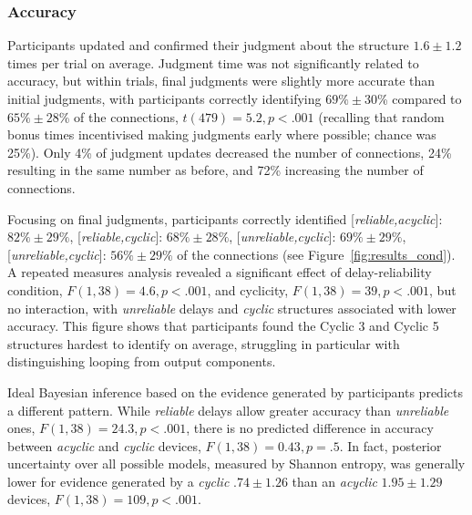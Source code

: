 \documentclass[10pt,letterpaper]{article}
\newcommand{\ttodo}[2][]
{\todo[caption={#2}, size=\small, #1, color = orange, inline]{\renewcommand{\baselinestretch}{1}\selectfont \textbf{TG}: #2}~}
\begin{document}
\subsubsection{Accuracy}

Participants updated and confirmed their judgment about the structure $1.6\pm1.2$ times per trial on average.  Judgment time was not significantly related to accuracy, but within trials, final judgments were slightly more accurate than initial judgments, with participants correctly identifying $69\%\pm30$\% compared to $65\%\pm28$\% of the connections, $t(479) = 5.2, p<.001$ (recalling that random bonus times incentivised making judgments early where possible; chance was 25\%). %
Only 4\% of judgment updates decreased the number of connections, 24\% resulting in the same number as before, and 72\% increasing the number of connections.

Focusing on final judgments, participants correctly identified [\emph{reliable,acyclic}]: $82\%\pm29\%$,  [\emph{reliable,cyclic}]: $68\%\pm28\%$,  [\emph{unreliable,cyclic}]: $69\%\pm29\%$,  [\emph{unreliable,cyclic}]: $56\%\pm29\%$ of the connections (see Figure~\ref{fig:results_cond}).  A repeated measures analysis revealed a significant effect of delay-reliability condition, $F(1, 38)=4.6, p<.001$, and cyclicity, $F(1, 38)= 39, p<.001$, but no interaction, with \emph{unreliable} delays and \emph{cyclic} structures associated with lower accuracy.  This figure shows that participants found the Cyclic 3 and Cyclic 5 structures hardest to identify on average, struggling in particular with distinguishing looping from output components.


Ideal Bayesian inference based on the evidence generated by participants predicts a different pattern.  While \emph{reliable} delays allow greater accuracy than \emph{unreliable} ones, $F(1,38) = 24.3, p<.001$, there is no predicted difference in accuracy between \emph{acyclic} and \emph{cyclic} devices, $F(1, 38)= 0.43, p=.5$.  In fact, posterior uncertainty over all possible models, measured by Shannon entropy, was generally lower for evidence generated by a \emph{cyclic} $.74\pm1.26$ than an \emph{acyclic} $1.95\pm1.29$ devices, $F(1,38) = 109, p<.001$.%
\end{document}
